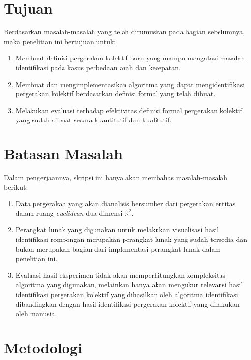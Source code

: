 \section{Tujuan}
\label{sec:tujuan}  

Berdasarkan masalah-masalah yang telah dirumuskan pada bagian sebelumnya, maka penelitian ini bertujuan untuk:

\begin{enumerate}
    \item Membuat definisi pergerakan kolektif baru yang mampu mengatasi masalah identifikasi pada kasus perbedaan arah dan kecepatan.
    \item Membuat dan mengimplementasikan algoritma yang dapat mengidentifikasi pergerakan kolektif berdasarkan definisi formal yang telah dibuat.
    \item Melakukan evaluasi terhadap efektivitas definisi formal pergerakan kolektif yang sudah dibuat secara kuantitatif dan kualitatif.
\end{enumerate}

\section{Batasan Masalah}
\label{sec:batasan}

Dalam pengerjaannya, skripsi ini hanya akan membahas masalah-masalah berikut:

\begin{enumerate}
    \item Data pergerakan yang akan dianalisis bersumber dari pergerakan entitas dalam ruang \textit{euclidean} dua dimensi $\mathbb{R}^2$.
    \item Perangkat lunak yang digunakan untuk melakukan visualisasi hasil identifikasi rombongan merupakan perangkat lunak yang sudah tersedia dan bukan merupakan bagian dari implementasi perangkat lunak dalam penelitian ini.
    \item Evaluasi hasil eksperimen tidak akan memperhitungkan kompleksitas algoritma yang digunakan, melainkan hanya akan mengukur relevansi hasil identifikasi pergerakan kolektif yang dihasilkan oleh algoritma identifikasi dibandingkan dengan hasil identifikasi pergerakan kolektif yang dilakukan oleh manusia.
\end{enumerate}

\section{Metodologi}
\label{sec:metlit}

